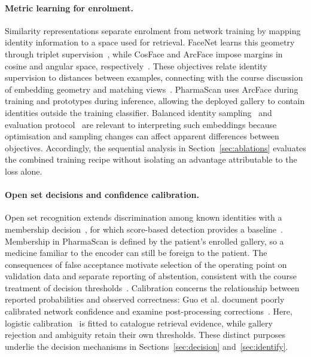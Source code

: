 \paragraph{Metric learning for enrolment.}
Similarity representations separate enrolment from network training by mapping identity information to a space used for retrieval. FaceNet learns this geometry through triplet supervision~\citep{schroff2015facenet}, while CosFace and ArcFace impose margins in cosine and angular space, respectively~\citep{wang2018cosface,deng2019arcface}. These objectives relate identity supervision to distances between examples, connecting with the course discussion of embedding geometry and matching views~\citep[pp.~38, 47--49]{md6329lecture08}. PharmaScan uses ArcFace during training and prototypes during inference, allowing the deployed gallery to contain identities outside the training classifier. Balanced identity sampling~\citep{hermans2017triplet} and evaluation protocol~\citep{musgrave2020reality} are relevant to interpreting such embeddings because optimisation and sampling changes can affect apparent differences between objectives. Accordingly, the sequential analysis in Section~\ref{sec:ablations} evaluates the combined training recipe without isolating an advantage attributable to the loss alone.

\paragraph{Open set decisions and confidence calibration.}
Open set recognition extends discrimination among known identities with a membership decision~\citep{scheirer2013openset}, for which score-based detection provides a baseline~\citep{hendrycks2017baseline}. Membership in PharmaScan is defined by the patient's enrolled gallery, so a medicine familiar to the encoder can still be foreign to the patient. The consequences of false acceptance motivate selection of the operating point on validation data and separate reporting of abstention, consistent with the course treatment of decision thresholds~\citep[p.~92]{md6329lecture02}. Calibration concerns the relationship between reported probabilities and observed correctness: Guo et al. document poorly calibrated network confidence and examine post-processing corrections~\citep{guo2017calibration}. Here, logistic calibration~\citep{platt1999probabilistic} is fitted to catalogue retrieval evidence, while gallery rejection and ambiguity retain their own thresholds. These distinct purposes underlie the decision mechanisms in Sections~\ref{sec:decision} and~\ref{sec:identify}.

